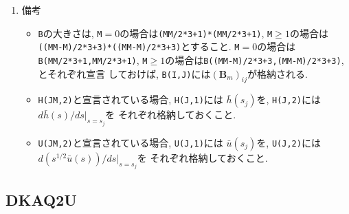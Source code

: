 \documentclass[a4j,fleqn]{jarticle}
\begin{document}
\begin{enumerate}
\item 備考

\begin{itemize}
\item {\tt B}の大きさは, {\tt M}$=0$の場合は{\tt (MM/2*3+1)*(MM/2*3+1)},
{\tt M}$\ge 1$の場合は{\tt ((MM-M)/2*3+3)*((MM-M)/2*3+3)}とすること.
{\tt M}$=0$の場合は{\tt B(MM/2*3+1,MM/2*3+1)},
{\tt M}$\ge 1$の場合は{\tt B((MM-M)/2*3+3,(MM-M)/2*3+3)}, とそれぞれ宣言
しておけば, {\tt B(I,J)}には$({\boldsymbol B}_m)_{ij}$が格納される.

\item {\tt H(JM,2)}と宣言されている場合, {\tt H(J,1)}には
$\bar h(s_j)$を, {\tt H(J,2)}には$d\bar h(s)/ds|_{s=s_j}$を
それぞれ格納しておくこと.

\item {\tt U(JM,2)}と宣言されている場合, {\tt U(J,1)}には
$\bar u(s_j)$を, {\tt U(J,2)}には$d(s^{1/2}\bar u(s))/ds|_{s=s_j}$を
それぞれ格納しておくこと.

\end{itemize}

\end{enumerate}


\subsection{DKAQ2U}
\end{document}

